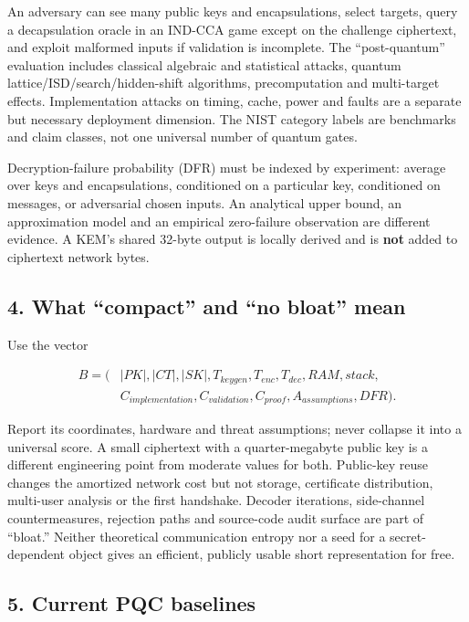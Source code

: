 \documentclass[
  10pt,
  a4paper,
]{article}
\begin{document}
An adversary can see many public keys and encapsulations, select
targets, query a decapsulation oracle in an IND-CCA game except on the
challenge ciphertext, and exploit malformed inputs if validation is
incomplete. The ``post-quantum'' evaluation includes classical algebraic
and statistical attacks, quantum lattice/ISD/search/hidden-shift
algorithms, precomputation and multi-target effects. Implementation
attacks on timing, cache, power and faults are a separate but necessary
deployment dimension. The NIST category labels are benchmarks and claim
classes, not one universal number of quantum gates.

Decryption-failure probability (DFR) must be indexed by experiment:
average over keys and encapsulations, conditioned on a particular key,
conditioned on messages, or adversarial chosen inputs. An analytical
upper bound, an approximation model and an empirical zero-failure
observation are different evidence. A KEM's shared 32-byte output is
locally derived and is \textbf{not} added to ciphertext network bytes.

\hypertarget{what-compact-and-no-bloat-mean}{%
\subsection{4. What ``compact'' and ``no bloat''
mean}\label{what-compact-and-no-bloat-mean}}

Use the vector

\[
\begin{aligned}
B=(&|PK|,|CT|,|SK|,T_{keygen},T_{enc},T_{dec},RAM,stack,\\
   &C_{implementation},C_{validation},C_{proof},A_{assumptions},DFR).
\end{aligned}
\]

Report its coordinates, hardware and threat assumptions; never collapse
it into a universal score. A small ciphertext with a quarter-megabyte
public key is a different engineering point from moderate values for
both. Public-key reuse changes the amortized network cost but not
storage, certificate distribution, multi-user analysis or the first
handshake. Decoder iterations, side-channel countermeasures, rejection
paths and source-code audit surface are part of ``bloat.'' Neither
theoretical communication entropy nor a seed for a secret-dependent
object gives an efficient, publicly usable short representation for
free.

\hypertarget{current-pqc-baselines}{%
\subsection{5. Current PQC baselines}\label{current-pqc-baselines}}
\end{document}
